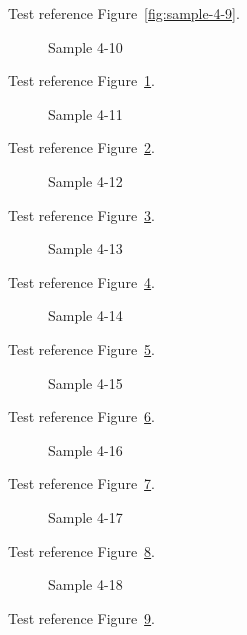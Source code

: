 Test reference Figure~\ref{fig:sample-4-9}.

\begin{figure}[tbhp]
\caption{Sample 4-10}
\label{fig:sample-4-10}
\end{figure}

Test reference Figure~\ref{fig:sample-4-10}.

\begin{figure}[tbhp]
\caption{Sample 4-11}
\label{fig:sample-4-11}
\end{figure}

Test reference Figure~\ref{fig:sample-4-11}.

\begin{figure}[tbhp]
\caption{Sample 4-12}
\label{fig:sample-4-12}
\end{figure}

Test reference Figure~\ref{fig:sample-4-12}.

\begin{figure}[tbhp]
\caption{Sample 4-13}
\label{fig:sample-4-13}
\end{figure}

Test reference Figure~\ref{fig:sample-4-13}.

\begin{figure}[tbhp]
\caption{Sample 4-14}
\label{fig:sample-4-14}
\end{figure}

Test reference Figure~\ref{fig:sample-4-14}.

\begin{figure}[tbhp]
\caption{Sample 4-15}
\label{fig:sample-4-15}
\end{figure}

Test reference Figure~\ref{fig:sample-4-15}.

\begin{figure}[tbhp]
\caption{Sample 4-16}
\label{fig:sample-4-16}
\end{figure}

Test reference Figure~\ref{fig:sample-4-16}.

\begin{figure}[tbhp]
\caption{Sample 4-17}
\label{fig:sample-4-17}
\end{figure}

Test reference Figure~\ref{fig:sample-4-17}.

\begin{figure}[tbhp]
\caption{Sample 4-18}
\label{fig:sample-4-18}
\end{figure}

Test reference Figure~\ref{fig:sample-4-18}.

